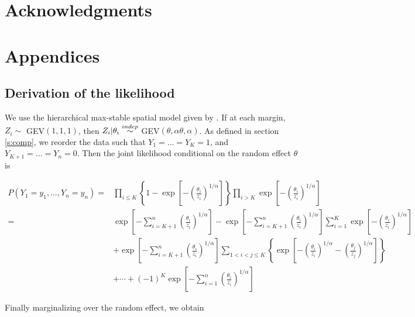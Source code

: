 \documentclass[11pt]{article}
\begin{document}
\section*{Acknowledgments}

\appendix
\section{Appendices}

\subsection{Derivation of the likelihood} \label{a:likelihoodderivation}
We use the hierarchical max-stable spatial model given by \citet{Reich2012}. If at each margin, $Z_i \sim $ GEV$(1,1,1)$, then $Z_i | \theta_i \stackrel{indep}{\sim} $ GEV$(\theta, \alpha \theta, \alpha)$. As defined in section \ref{s:comp}, we reorder the data such that $Y_1=\ldots=Y_K=1$, and $Y_{K+1} = \ldots = Y_n = 0$. Then the joint likelihood conditional on the random effect $\theta$ is

\begin{align} \label{joint_cond}
	P(Y_1=y_1,\ldots,Y_n=y_n) =& \prod_{ i \le K } \left\{ 1 - \exp \left[ - \left( \frac{ \theta_i }{ z_i } \right)^{ 1/\alpha} \right] \right \} \prod_{ i > K } \exp \left[ -\left( \frac{ \theta_i }{ z_i } \right)^{1/\alpha} \right] \nonumber \\[0.5em]
		=& \exp \left[ -\sum_{ i = K+1}^{ n }\left( \frac{ \theta_i }{ z_i } \right)^{1/\alpha} \right] - \exp \left[ -\sum_{ i = K+1}^{ n }\left( \frac{ \theta_i }{ z_i } \right)^{1/\alpha} \right] \sum_{ i = 1}^{K} \exp\left[ -\left( \frac{ \theta_i }{ z_i } \right)^{ 1/\alpha} \right] \nonumber\\
		&  + \exp \left[ -\sum_{ i = K+1}^{ n }\left( \frac{ \theta_i }{ z_i } \right)^{1/\alpha} \right] \sum_{ 1 < i < j \le K } \left\{ \exp \left[ - \left( \frac{ \theta_i }{ z_i } \right)^{ 1/\alpha} - \left( \frac{ \theta_j }{ z_j } \right)^{ 1/\alpha } \right] \right \} \nonumber \\[0.5em]
		& + \cdots + (-1)^K \exp\left[ - \sum_{ i = 1 }^{ n }\left( \frac{ \theta_i }{ z_i } \right)^{ 1/\alpha} \right]
\end{align}

Finally marginalizing over the random effect, we obtain
\end{document}
